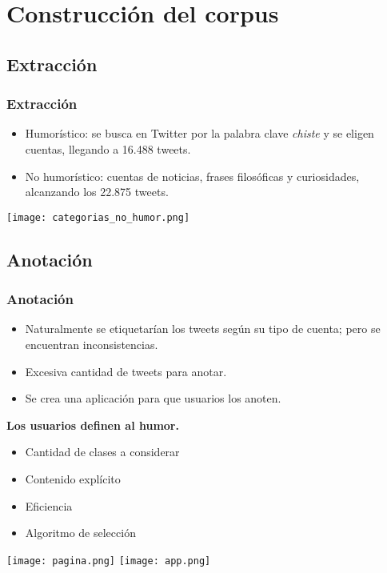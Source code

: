 \section{Construcción del corpus}

\subsection{Extracción}
\begin{frame}[allowframebreaks]
    \frametitle{Extracción}

    \begin{itemize}
        \item Humorístico: se busca en Twitter por la palabra clave \emph{chiste} y se eligen cuentas, llegando a 16.488 tweets.
        \item No humorístico: cuentas de noticias, frases filosóficas y curiosidades, alcanzando los 22.875 tweets.
    \end{itemize}

    \begin{center}
        \texttt{[image: categorias\_no\_humor.png]}
    \end{center}
\end{frame}

\subsection{Anotación}
\begin{frame}[allowframebreaks]
    \frametitle{Anotación}

    \begin{itemize}
        \item Naturalmente se etiquetarían los tweets según su tipo de cuenta; pero se encuentran inconsistencias.
        \item Excesiva cantidad de tweets para anotar.
        \item Se crea una aplicación para que usuarios los anoten.
    \end{itemize}

    \begin{center}
        \bf
        Los usuarios definen al humor.
    \end{center}

    \framebreak

    \begin{itemize}
        \item Cantidad de clases a considerar
        \item Contenido explícito
        \item Eficiencia
        \item Algoritmo de selección
    \end{itemize}

    \framebreak

    \begin{center}
        \texttt{[image: pagina.png]}
        \hspace{1cm}
        \texttt{[image: app.png]}
    \end{center}
\end{frame}

